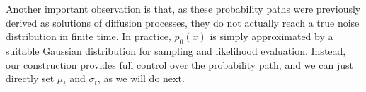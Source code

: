 \documentclass{article}
\begin{document}
Another important observation is that, as these probability paths were previously derived as solutions of diffusion processes, they do not actually reach a true noise distribution in finite time. In practice, $p_0(x)$ is simply approximated by a suitable Gaussian distribution for sampling and likelihood evaluation. Instead, our construction provides full control over the probability path, and we can just directly set $\mu_t$ and $\sigma_t$, as we will do next.


\end{document}
